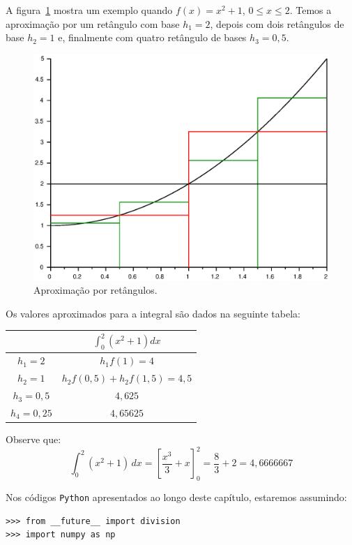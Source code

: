 \begin{ex}
A figura~\ref{fig:int_101} mostra um exemplo quando $f(x)=x^2+1$, $0\leq x\leq 2$. Temos a aproximação por um retângulo com base $h_1=2$, depois com dois retângulos de base $h_2=1$ e, finalmente com quatro retângulo de bases $h_3=0,5$.
\begin{figure}
  \centering
  \includegraphics[scale=0.7]{./cap_integracao/pics/int_1/int_1.eps}
  \caption{Aproximação por retângulos.}
  \label{fig:int_101}
\end{figure}

Os valores aproximados para a integral são dados na seguinte tabela:

\begin{tabular}{|c|c|}\hline
  & $\displaystyle \int_0^2(x^2+1)dx$ \\ \hline
  $h_1=2$ & $h_1f(1)=4$ \\
  $h_2=1$ & $h_2f(0,5)+h_2f(1,5)=4,5$ \\
  $h_3=0,5$ & $4,625$ \\
  $h_4=0,25$ & $4,65625$ \\\hline
\end{tabular}

Observe que:
\begin{equation*}
  \int_0^2(x^2+1)\,dx = \left[\frac{x^3}{3}+x\right]_0^2 = \frac{8}{3}+2=4,6666667
\end{equation*}
\end{ex}

\ifispython
Nos códigos \verb+Python+ apresentados ao longo deste capítulo, estaremos assumindo:
\begin{verbatim}
>>> from __future__ import division
>>> import numpy as np
\end{verbatim}
\fi



